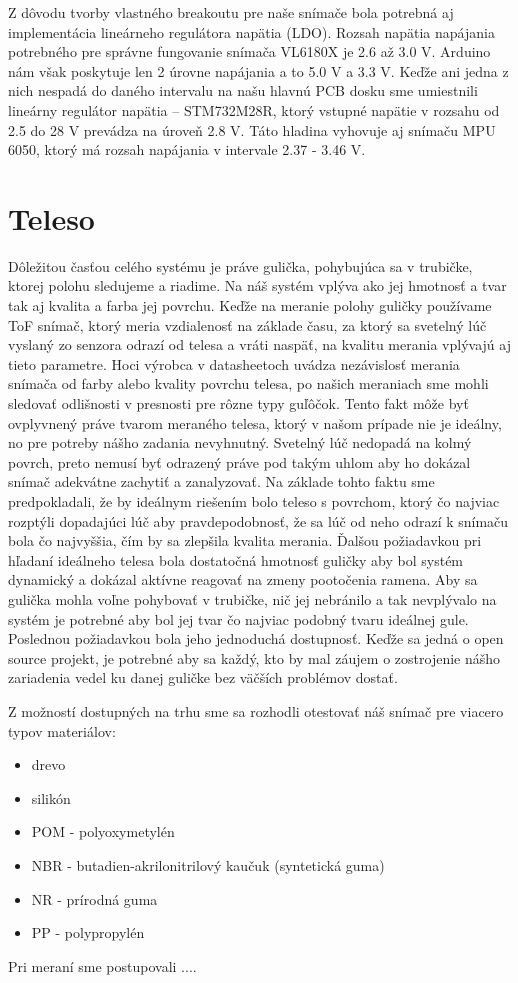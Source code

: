 Z dôvodu tvorby vlastného breakoutu pre naše snímače bola potrebná aj implementácia lineárneho regulátora napätia (LDO). Rozsah napätia napájania potrebného pre správne fungovanie snímača VL6180X je 2.6 až 3.0 V. Arduino nám však poskytuje len 2 úrovne napájania a to 5.0 V a 3.3 V. Keďže ani jedna z nich nespadá do daného intervalu na našu hlavnú PCB dosku sme umiestnili lineárny regulátor napätia – STM732M28R, ktorý vstupné napätie v rozsahu od 2.5 do 28 V prevádza na úroveň 2.8 V. Táto hladina vyhovuje aj snímaču MPU 6050, ktorý má rozsah napájania v intervale 2.37 - 3.46 V.  


\section{Teleso}
\label{kap:2.3}

Dôležitou časťou celého systému je práve gulička, pohybujúca sa v trubičke, ktorej polohu sledujeme a riadime. Na náš systém vplýva ako jej hmotnosť a tvar tak aj kvalita a farba jej povrchu. Keďže na meranie polohy guličky používame ToF snímač, ktorý meria vzdialenosť na základe času, za ktorý sa svetelný lúč vyslaný zo senzora odrazí od telesa a vráti naspäť, na kvalitu merania vplývajú aj tieto parametre. Hoci výrobca v datasheetoch uvádza nezávislosť merania snímača od farby alebo kvality povrchu telesa, po našich meraniach sme mohli sledovať odlišnosti v presnosti pre rôzne typy guľôčok. Tento fakt môže byť ovplyvnený práve tvarom meraného telesa, ktorý v našom prípade nie je ideálny, no pre potreby nášho zadania nevyhnutný. Svetelný lúč nedopadá na kolmý povrch, preto nemusí byť odrazený práve pod takým uhlom aby ho dokázal snímač adekvátne zachytiť a zanalyzovať. Na základe tohto faktu sme predpokladali, že by ideálnym riešením bolo teleso s povrchom, ktorý čo najviac rozptýli dopadajúci lúč aby pravdepodobnosť, že sa lúč od neho odrazí k snímaču bola čo najvyššia, čím by sa zlepšila kvalita merania. Ďalšou požiadavkou pri hľadaní ideálneho telesa bola dostatočná hmotnosť guličky aby bol systém dynamický a dokázal aktívne reagovať na zmeny pootočenia ramena. Aby sa gulička mohla voľne pohybovať v trubičke, nič jej nebránilo a tak nevplývalo na systém je potrebné aby bol jej tvar čo najviac podobný tvaru ideálnej gule. Poslednou požiadavkou bola jeho jednoduchá dostupnosť. Keďže sa jedná o open source projekt, je potrebné aby sa každý, kto by mal záujem o zostrojenie nášho zariadenia vedel ku danej guličke bez väčších problémov dostať. 

Z možností dostupných na trhu sme sa rozhodli otestovať náš snímač  pre viacero typov materiálov:
\begin{itemize}
	\item drevo
	\item silikón
	\item POM - polyoxymetylén
	\item NBR - butadien-akrilonitrilový kaučuk (syntetická guma)
	\item NR - prírodná guma
	\item PP - polypropylén
\end{itemize}
Pri meraní sme postupovali ....

